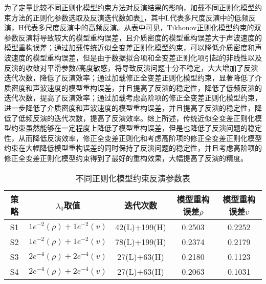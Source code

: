 \documentclass[12pt]{article}
\begin{document}
为了定量比较不同正则化模型约束方法对反演结果的影响，加载不同正则化模型约束方法的正则化参数选取及反演迭代数如表\ref{RegularizationTab}，其中L代表多尺度反演中的低频反演，H代表多尺度反演中的高频反演。从表中可见，Tikhonov正则化模型约束的双参数反演将导致较大的模型重构误差，且介质密度的模型重构误差大于声波速度的模型重构误差；通过加载传统近似全变差正则化模型约束，可以降低介质密度和声波速度的模型重构误差，但是由于数据拟合项和全变差正则化项引起的非线性以及反演的收敛对平滑参数$\delta$高度敏感，将导致反演问题十分不稳定，大大增加了反演迭代次数，降低了反演效率；通过加载修正全变差正则化模型约束，显著降低了介质密度和声波速度的模型重构误差，并且提高了反演的稳定性，降低了低频反演的迭代次数，提高了反演效率；通过加载考虑高阶项的修正全变差正则化模型约束，进一步降低了介质密度和声波速度的模型重构误差，并且提高了反演的稳定性，降低了低频反演的迭代次数，提高了反演效率。综上所述，传统近似全变差正则化模型约束虽然能够在一定程度上降低了模型重构误差，但是也降低了反演问题的稳定性，从而降低反演效率，修正全变差正则化和考虑高阶项的修正全变差正则化模型约束在大幅降低模型重构误差的同时保持了反演问题的稳定性，并且考虑高阶项的修正全变差正则化模型约束得到了最好的重构效果，大幅提高了反演的精度。
\begin{table}[H]
\centering
\caption{不同正则化模型约束反演参数表}\label{RegularizationTab}
\renewcommand\tabcolsep{0.5em}
\begin{tabular}{ccccc}
\toprule
{策略} & {$\lambda_0$取值} & {迭代次数} & {模型重构误差$\rho$} & {模型重构误差$v$}\\
\midrule 
S1 & $1e^{-2}(\rho)+1e^{-2}(v)$ & 42(L)+199(H) & 0.2503 & 0.2252\\
S2 & $1e^{-2}(\rho)+1e^{-2}(v)$ & 78(L)+199(H) & 0.2374 & 0.2179\\
S3 & $2e^{-4}(\rho)+2e^{-4}(v)$ & 27(L)+63(H) & 0.2180 & 0.1123\\
S4 & $2e^{-4}(\rho)+2e^{-4}(v)$ & 27(L)+63(H) & 0.2063 & 0.1031\\
\bottomrule
\end{tabular}
\end{table}
\par
\end{document}
